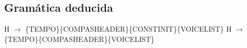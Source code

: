 %
%
%
%
%
%
%
%
%
%
%
%
%
%
%
%
%
%
%

\subsection{Gramática deducida}
H $\rightarrow$ \{TEMPO\}\{COMPASHEADER\}\{CONSTINIT\}\{VOICELIST\}\newline
H $\rightarrow$ \{TEMPO\}\{COMPASHEADER\}\{VOICELIST\}\newline

